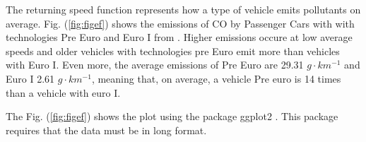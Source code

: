 \documentclass[12pt,graybox,envcountchap,sectrefs]{krantz}
\makeatletter
\newenvironment{Shaded}{\begin{snugshade}}{\end{snugshade}}
\newcommand{\KeywordTok}[1]{\textcolor[rgb]{0.13,0.29,0.53}{\textbf{#1}}}
\newcommand{\DataTypeTok}[1]{\textcolor[rgb]{0.13,0.29,0.53}{#1}}
\newcommand{\DecValTok}[1]{\textcolor[rgb]{0.00,0.00,0.81}{#1}}
\newcommand{\StringTok}[1]{\textcolor[rgb]{0.31,0.60,0.02}{#1}}
\newcommand{\OperatorTok}[1]{\textcolor[rgb]{0.81,0.36,0.00}{\textbf{#1}}}
\newcommand{\NormalTok}[1]{#1}
\newenvironment{kframe}{%
\medskip{}
\setlength{\fboxsep}{.8em}
 \def\at@end@of@kframe{}%
 \ifinner\ifhmode%
  \def\at@end@of@kframe{\end{minipage}}%
  \begin{minipage}{\columnwidth}%
 \fi\fi%
 \def\FrameCommand##1{\hskip\@totalleftmargin \hskip-\fboxsep
 \colorbox{shadecolor}{##1}\hskip-\fboxsep
     \hskip-\linewidth \hskip-\@totalleftmargin \hskip\columnwidth}%
 \MakeFramed {\advance\hsize-\width
   \@totalleftmargin\z@ \linewidth\hsize
   \@setminipage}}%
 {\par\unskip\endMakeFramed%
 \at@end@of@kframe}
\renewenvironment{Shaded}{\begin{kframe}}{\end{kframe}}
\theoremstyle{definition}
\theoremstyle{definition}
\theoremstyle{definition}
\theoremstyle{remark}
\makeatother
\begin{document}
The returning speed function represents how a type of vehicle emits
pollutants on average. Fig. (\ref{fig:figef}) shows the emissions of CO
by Passenger Cars with with technologies Pre Euro and Euro I from
\citet{NtziachristosSamaras2016}. Higher emissions occure at low average
speeds and older vehicles with technologies pre Euro emit more than
vehicles with Euro I. Even more, the average emissions of Pre Euro are
29.31 \(g \cdot km^{-1}\) and Euro I 2.61 \(g \cdot km^{-1}\), meaning
that, on average, a vehicle Pre euro is 14 times than a vehicle with
euro I.

The Fig. (\ref{fig:figef}) shows the plot using the package ggplot2
\citep{ggplot2}. This package requires that the data must be in long
format.

\begin{Shaded}
\end{Shaded}
\end{document}
